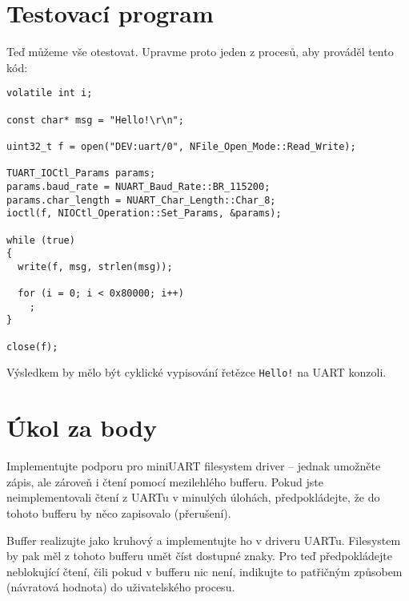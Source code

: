 \documentclass{article}
\begin{document}
\section{Testovací program}

Teď můžeme vše otestovat. Upravme proto jeden z procesů, aby prováděl tento kód:
\begin{lstlisting}
volatile int i;

const char* msg = "Hello!\r\n";

uint32_t f = open("DEV:uart/0", NFile_Open_Mode::Read_Write);

TUART_IOCtl_Params params;
params.baud_rate = NUART_Baud_Rate::BR_115200;
params.char_length = NUART_Char_Length::Char_8;
ioctl(f, NIOCtl_Operation::Set_Params, &params);

while (true)
{
  write(f, msg, strlen(msg));
	
  for (i = 0; i < 0x80000; i++)
    ;
}

close(f);
\end{lstlisting}
Výsledkem by mělo být cyklické vypisování řetězce \texttt{Hello!} na UART konzoli.



\section{Úkol za body}

Implementujte podporu pro miniUART filesystem driver -- jednak umožněte zápis, ale zároveň i čtení pomocí mezilehlého bufferu. Pokud jste neimplementovali čtení z UARTu v minulých úlohách, předpokládejte, že do tohoto bufferu by něco zapisovalo (přerušení).

Buffer realizujte jako kruhový a implementujte ho v driveru UARTu. Filesystem by pak měl z tohoto bufferu umět číst dostupné znaky. Pro teď předpokládejte neblokující čtení, čili pokud v bufferu nic není, indikujte to patřičným způsobem (návratová hodnota) do uživatelského procesu.
\end{document}
